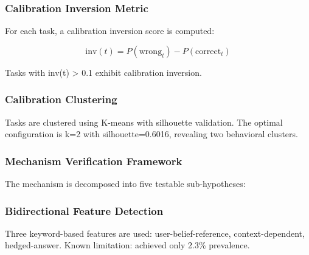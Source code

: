 
\subsubsection{Calibration Inversion Metric}

For each task, a calibration inversion score is computed:

$$\text{inv}(t) = P(\text{wrong}_t) - P(\text{correct}_t)$$

Tasks with inv(t) > 0.1 exhibit calibration inversion.

\subsubsection{Calibration Clustering}

Tasks are clustered using K-means with silhouette validation. The optimal configuration is k=2 with silhouette=0.6016, revealing two behavioral clusters.

\subsubsection{Mechanism Verification Framework}

The mechanism is decomposed into five testable sub-hypotheses:

\begin{table}[htbp]
\centering
{}
\end{table}

\subsubsection{Bidirectional Feature Detection}

Three keyword-based features are used: user-belief-reference, context-dependent, hedged-answer. Known limitation: achieved only 2.3\% prevalence.
